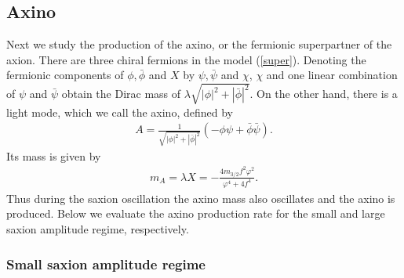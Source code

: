 \documentclass[12pt, a4paper]{article}
\begin{document}
\subsection{Axino}


Next we study the production of the axino, or the fermionic superpartner of the axion.
There are three chiral fermions in the model (\ref{super}).
Denoting the fermionic components of $\phi, \bar\phi$ and $X$ by $\psi, \bar\psi$ and $\chi$, 
$\chi$ and one linear combination of $\psi$ and $\bar\psi$ obtain the Dirac mass of $\lambda\sqrt{|\phi|^2+|\bar\phi|^2}$.
On the other hand, there is a light mode, which we call the axino, defined by
\begin{align}
	A =\frac{1}{\sqrt{ |\phi|^2 + |\bar\phi|^2 }}\left( -\phi \psi + \bar\phi \bar\psi \right).
\end{align}
Its mass is given by
\begin{align}
	m_A = \lambda X = -\frac{4m_{3/2} f^2\varphi^2}{\varphi^4 + 4f^4}.  \label{m_axino}
\end{align}
Thus during the saxion oscillation the axino mass also oscillates and the axino is produced.
Below we evaluate the axino production rate for the small and large saxion amplitude regime, respectively.


\subsubsection{Small saxion amplitude regime}  \label{sec:axino_small}
\end{document}
